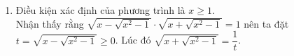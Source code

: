\begin{vd}
{\begin{enumerate}
\begin{eqnarray*}
				&\Leftrightarrow & x=2.
			\end{eqnarray*}
			Với $t=-\dfrac{5}{2}$, ta có
			\allowdisplaybreaks
			\begin{eqnarray*}
				&& \sqrt{x+7}-\sqrt{2-x}=-\dfrac{5}{2}\\
				&\Leftrightarrow & 2\sqrt{x+7}+5=2\sqrt{2-x}\\
				&\Leftrightarrow & 4x+28+20\sqrt{x+7}+25=8-4x\\
				&\Leftrightarrow & 20\sqrt{x+7}=-45-8x\\
				&\Leftrightarrow & \heva{&x+7 \geq 0 \\&64x^2+320x-775}\\
				&\Leftrightarrow & \heva{&x \geq -7 \\& \hoac{&x=-\dfrac{5}{2}-\dfrac{5\sqrt{47}}{8} \\&x=-\dfrac{5}{2}+\dfrac{5\sqrt{47}}{8}}}\\
				&\Leftrightarrow & \hoac{&x=-\dfrac{5}{2}-\dfrac{5\sqrt{47}}{8} \\&x=-\dfrac{5}{2}+\dfrac{5\sqrt{47}}{8}.}
			\end{eqnarray*}
			Kết hợp điều kiện xác định ta được $x=2$, $x=-\dfrac{5}{2}-\dfrac{5\sqrt{47}}{8}$ là các nghiệm của phương trình đã cho.
			\item Điều kiện xác định của phương trình là $x \geq 1$.\\
			Nhận thấy rằng $\sqrt{x-\sqrt{x^2-1}}\cdot \sqrt{x+\sqrt{x^2-1}}=1$ nên ta đặt $t=\sqrt{x-\sqrt{x^2-1}}\ge 0$. Lúc đó $\sqrt{x+\sqrt{x^2-1}}=\dfrac{1}{t}$.\\
			

\end{enumerate}}
\end{vd}
